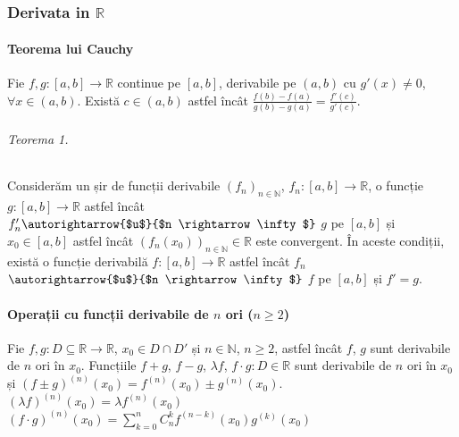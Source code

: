 \part{}

\section{Derivata in $\mathbb{R}$}

\subsection{Teorema lui Cauchy}
Fie $f, g:[a, b] \rightarrow \mathbb{R}$ continue pe $[a, b]$, derivabile pe $(a, b)$ cu $g'(x) \neq 0$, $\forall x \in (a, b)$. Există $c \in (a, b)$ astfel încât
$\displaystyle\frac{f(b) - f(a)}{g(b)-g(a)} = \displaystyle\frac{f'(c)}{g'(c)}$.

\paragraph{Teorema 1.}
Considerăm un șir de funcții derivabile $(f_{n})_{n \in \mathbb{N}}$, $f_{n}:[a, b] \rightarrow \mathbb{R}$, o funcție $g:[a, b] \rightarrow \mathbb{R}$ astfel încât
$f_{n}' \autorightarrow{$u$}{$n \rightarrow \infty$}$ $g$ pe $[a, b]$ și $x_{0} \in [a, b]$ astfel încât $(f_{n}(x_{0}))_{n \in \mathbb{N}} \in \mathbb{R}$ este convergent.
În aceste condiții, există o funcție derivabilă $f:[a, b] \rightarrow \mathbb{R}$ astfel încât $f_{n}$ $\autorightarrow{$u$}{$n \rightarrow \infty$}$ $f$ pe $[a, b]$ și $f' = g$.

\subsection{Operații cu funcții derivabile de $n$ ori ($n \geq 2$)}
Fie $f, g: D \subseteq \mathbb{R} \rightarrow \mathbb{R}$, $x_{0} \in D \cap D'$ și $n \in \mathbb{N}$, $n \geq 2$, astfel încât
$f$, $g$ sunt derivabile de $n$ ori în $x_{0}$. Funcțiile $f+g$, $f-g$, $\lambda f$, $f \cdot g: D \in \mathbb{R}$ sunt derivabile
de $n$ ori în $x_{0}$ și $(f \pm g)^{(n)}(x_{0}) = f^{(n)}(x_{0}) \pm g^{(n)}(x_{0})$. \\[20pt]
$(\lambda f)^{(n)}(x_{0}) = \lambda f^{(n)}(x_{0})$ \\[7pt]
$(f \cdot g)^{(n)}(x_{0}) = \displaystyle\sum_{k=0}^{n} C_{n}^{k}f^{(n-k)}(x_{0})g^{(k)}(x_{0})$

